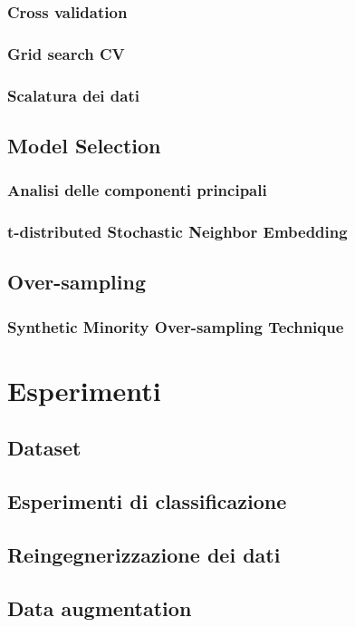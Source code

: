 \documentclass[12pt, twoside, letterpaper]{report}
\begin{document}
			\subsection{Cross validation}
			\subsection{Grid search CV}
			\subsection{Scalatura dei dati}
		\section{Model Selection}			
			\subsection{Analisi delle componenti principali}
			\subsection{t-distributed Stochastic Neighbor Embedding}
		\section{Over-sampling}
			\subsection{Synthetic Minority Over-sampling Technique}
		
	\chapter{Esperimenti}
		\section{Dataset}
		\section{Esperimenti di classificazione}
		\section{Reingegnerizzazione dei dati}
		\section{Data augmentation}
\end{document}
